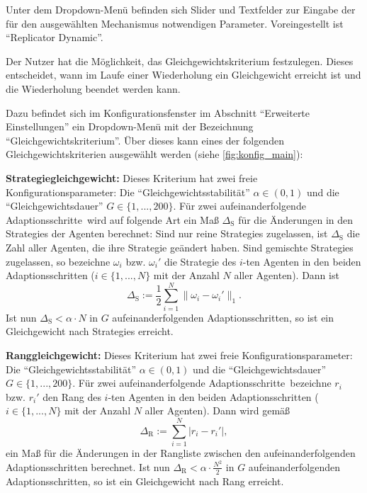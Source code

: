 \documentclass[parskip=full,11pt]{scrartcl}
\def\adapts{Adaptionsschritte}
\begin{document}
Unter dem Dropdown-Menü befinden sich Slider und Textfelder zur Eingabe der für den ausgewählten Mechanismus notwendigen Parameter. Voreingestellt ist \enquote{Replicator Dynamic}.

Der \Gls{Nutzer} hat die Möglichkeit, das Gleichgewichtskriterium festzulegen. Dieses entscheidet, wann im Laufe einer Wiederholung ein \Gls{Gleichgewicht} erreicht ist und die Wiederholung beendet werden kann.

Dazu befindet sich im Konfigurationsfenster im Abschnitt \enquote{Erweiterte Einstellungen} ein Dropdown-Menü mit der Bezeichnung \enquote{Gleichgewichtskriterium}. Über dieses kann eines der folgenden Gleichgewichtskriterien ausgewählt werden (siehe \cref{fig:konfig_main}):

\textbf{Strategiegleichgewicht:}
Dieses Kriterium hat zwei freie Konfigurationsparameter: Die \enquote{Gleichgewichtsstabilität} \(\alpha \in (0,1)\) und die \enquote{Gleichgewichtsdauer} \(G \in \{1,...,200\}\). Für zwei aufeinanderfolgende \adapts\ wird auf folgende Art ein Maß \(\Delta_\text{S}\) für die Änderungen in den \Glspl{Strategie} der Agenten berechnet: Sind nur reine \Glspl{Strategie} zugelassen, ist \(\Delta_\text{S}\)  die Zahl aller Agenten, die ihre \Gls{Strategie} geändert haben. Sind \glspl{gemischte Strategie} zugelassen, so bezeichne \(\omega_i\) bzw. \(\omega_i'\) die \Gls{Strategie} des \(i\)-ten Agenten in den beiden \adapts n (\(i \in \{1,...,N\}\) mit der Anzahl \(N\) aller Agenten). Dann ist
\[
\Delta_\text{S} :=\frac 12 \sum_{i=1}^N \|\omega_i - \omega_i'\|_1.
\]
Ist nun \(\Delta_\text{S} < \alpha \cdot N\) in \(G\) aufeinanderfolgenden \adapts n, so ist ein \Gls{Gleichgewicht} nach \Glspl{Strategie} erreicht.

\textbf{Ranggleichgewicht:}
Dieses Kriterium hat zwei freie Konfigurationsparameter: Die \enquote{Gleichgewichtsstabilität} \(\alpha \in (0,1)\) und die \enquote{Gleichgewichtsdauer} \(G \in \{1,...,200\}\). Für zwei aufeinanderfolgende \adapts\ bezeichne \(r_i\) bzw. \(r_i'\) den Rang des \(i\)-ten Agenten in den beiden \adapts n (\(i \in \{1,...,N\}\) mit der Anzahl \(N\) aller Agenten). Dann wird gemäß
\[
\Delta_\text{R} := \sum_{i=1}^N |r_i - r_i'|,
\]
ein Maß für die Änderungen in der Rangliste zwischen den aufeinanderfolgenden \adapts n berechnet. Ist nun \(\Delta_\text{R} < \alpha \cdot \frac{N^2}{2}\) in \(G\) aufeinanderfolgenden \adapts n, so ist ein \Gls{Gleichgewicht} nach Rang erreicht.
\end{document}

